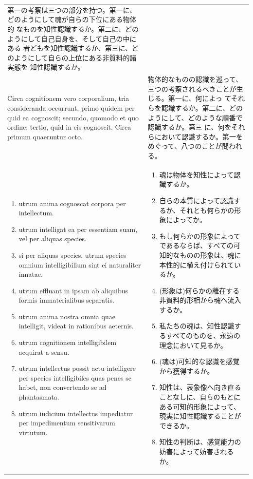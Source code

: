 \documentclass[paper=a4paper,fontsize=10pt,jafontsize=9pt,titlepage]{jlreq}
\begin{document}
\begin{longtable}{p{21em}p{21em}}
 第一の考察は三つの部分を持つ。第一に、どのようにして魂が自らの下位にある物体的
 なものを知性認識するか。第二に、どのようにして自己自身を、そして自己の中にある
 者どもを知性認識するか、第三に、どのようにして自らの上位にある非質料的諸実態を
 知性認識するか。

\\[1em]

 Circa cognitionem vero corporalium, tria consideranda occurrunt, primo quidem
per quid ea cognoscit; secundo, quomodo et quo ordine; tertio, quid in eis
cognoscit. Circa primum quaeruntur octo.

 &

 物体的なものの認識を巡って、三つの考察されるべきことが生じる。第一に、何によっ
 てそれらを認識するか。第二に、どのようにして、どのような順番で認識するか。第三
 に、何をそれらにおいて認識するか。第一をめぐって、八つのことが問われる。

 \\[1em]
 \begin{enumerate}
  \item utrum anima cognoscat corpora per intellectum.
  \item utrum intelligat ea per essentiam suam, vel per aliquas species.
  \item si per aliquas species, utrum species omnium intelligibilium sint ei naturaliter innatae.
  \item utrum effluant in ipsam ab aliquibus formis immaterialibus separatis.
  \item utrum anima nostra omnia quae intelligit, videat in rationibus aeternis.
  \item utrum cognitionem intelligibilem acquirat a sensu.
  \item utrum intellectus possit actu intelligere per species intelligibiles quas penes se habet, non convertendo se ad phantasmata.
  \item utrum iudicium intellectus impediatur per impedimentum sensitivarum virtutum.
 \end{enumerate}

 &

 \begin{enumerate}
  \item 魂は物体を知性によって認識するか。
  \item 自らの本質によって認識するか、それとも何らかの形象によってか。
  \item もし何らかの形象によってであるならば、すべての可知的なものの形象は、魂に本性的に植え付けられているか。
  \item (形象は)何らかの離在する非質料的形相から魂へ流入するか。
  \item 私たちの魂は、知性認識するすべてのものを、永遠の理念において見るか。
  \item (魂は)可知的な認識を感覚から獲得するか。
  \item 知性は、表象像へ向き直ることなしに、自らのもとにある可知的形象によって、現実に知性認識することができるか。
  \item 知性の判断は、感覚能力の妨害によって妨害されるか。
 \end{enumerate}
\end{longtable}
\end{document}
